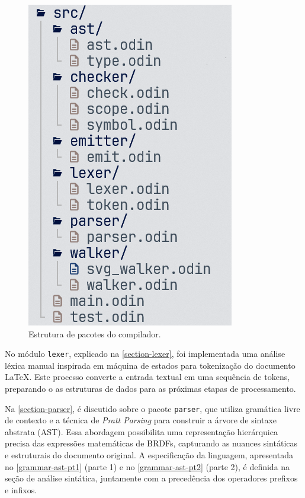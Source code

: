 \begin{figure}[!ht]
  \caption{\label{estrutura-de-pacotes} \small Estrutura de pacotes do compilador.}
  \begin{center}
    \includegraphics[scale=0.5]{./Imagens/package-structure.png}
  \end{center}
\end{figure}

No módulo \texttt{lexer}, explicado na \autoref{section-lexer}, foi implementada uma análise léxica manual inspirada em máquina de estados para tokenização do documento \LaTeX{}. Este processo converte a entrada textual em uma sequência de tokens, preparando o as estruturas de dados para as próximas etapas de processamento.


Na \autoref{section-parser}, é discutido sobre o pacote \texttt{parser}, que utiliza gramática livre de contexto e a técnica de \textit
{Pratt Parsing} para construir a árvore de sintaxe abstrata (AST). Essa abordagem possibilita uma representação hierárquica precisa das expressões matemáticas de BRDFs, capturando as nuances sintáticas e estruturais do documento original. A especificação da linguagem, apresentada no \autoref{grammar-ast-pt1} (parte 1) e no \autoref{grammar-ast-pt2} (parte 2), é definida na seção de análise sintática, juntamente com a precedência dos operadores prefixos e infixos.

